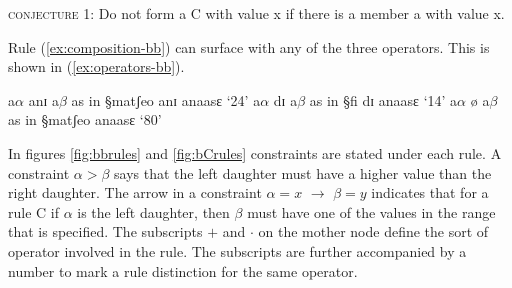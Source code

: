 \begin{description}
\item \textsc{conjecture 1}: Do not form a {\W C} with value x if there is a
member
{\W a} with value x.
\end{description}


Rule (\ref{ex:composition-bb}) can surface with any of the three operators.
This is shown in (\ref{ex:operators-bb}). 


 \begin{exe}
  \ex\label{ex:operators-bb}
\begin{xlist}
\ex\label{ex:} {\W a}$\alpha$ anɪ {\W a}$\beta$   as in  {\S matʃeo anɪ anaasɛ}
`24'
\ex\label{ex:} {\W a}$\alpha$ dɪ {\W a}$\beta$     as in {\S fi dɪ anaasɛ} `14'
\ex\label{ex:}  {\W a}$\alpha$ ø {\W a}$\beta$    as in  {\S matʃeo anaasɛ}
`80'
\end{xlist}

 \end{exe}




In figures \ref{fig:bbrules} and \ref{fig:bCrules}  constraints are stated under
each  rule. A constraint $\alpha > \beta$ says that the left daughter
must have a higher value than the right daughter. The arrow in a constraint
$\alpha = x$ $\rightarrow$ $\beta =y$ indicates that for  a rule {\W C} if
$\alpha$
is
the left daughter, then $\beta$ must have one of the values in the range that is
specified. The  subscripts $+$
and $\cdot$ on the mother node define the sort of operator involved in the
rule. The subscripts
are further accompanied by a number to mark a rule distinction  for the same
operator. 



